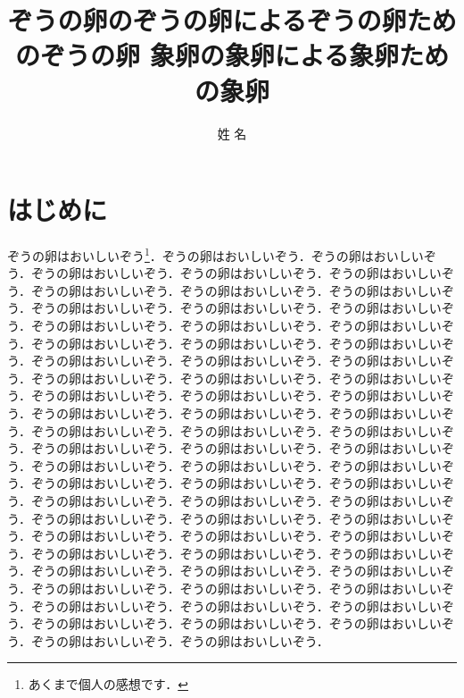 \documentclass[
	10pt,
	a4j,		%
	twocolumn,	%
	uplatex
]{jsarticle}
\title{ぞうの卵のぞうの卵によるぞうの卵ためのぞうの卵 \linebreak 象卵の象卵による象卵ための象卵}
\author{姓 名}
\begin{document}
\maketitle

\section{はじめに}
\label{sec:introduction}
ぞうの卵はおいしいぞう\footnote{あくまで個人の感想です．}．ぞうの卵はおいしいぞう．ぞうの卵はおいしいぞう．ぞうの卵はおいしいぞう．ぞうの卵はおいしいぞう．ぞうの卵はおいしいぞう．ぞうの卵はおいしいぞう．ぞうの卵はおいしいぞう．ぞうの卵はおいしいぞう．ぞうの卵はおいしいぞう．ぞうの卵はおいしいぞう．ぞうの卵はおいしいぞう．ぞうの卵はおいしいぞう．ぞうの卵はおいしいぞう．ぞうの卵はおいしいぞう．ぞうの卵はおいしいぞう．ぞうの卵はおいしいぞう．ぞうの卵はおいしいぞう．ぞうの卵はおいしいぞう．ぞうの卵はおいしいぞう．ぞうの卵はおいしいぞう．ぞうの卵はおいしいぞう．ぞうの卵はおいしいぞう．ぞうの卵はおいしいぞう．ぞうの卵はおいしいぞう．ぞうの卵はおいしいぞう．ぞうの卵はおいしいぞう．ぞうの卵はおいしいぞう．ぞうの卵はおいしいぞう．ぞうの卵はおいしいぞう．ぞうの卵はおいしいぞう．ぞうの卵はおいしいぞう．ぞうの卵はおいしいぞう．ぞうの卵はおいしいぞう．ぞうの卵はおいしいぞう．ぞうの卵はおいしいぞう．ぞうの卵はおいしいぞう．ぞうの卵はおいしいぞう．ぞうの卵はおいしいぞう．ぞうの卵はおいしいぞう．ぞうの卵はおいしいぞう．ぞうの卵はおいしいぞう．ぞうの卵はおいしいぞう．ぞうの卵はおいしいぞう．ぞうの卵はおいしいぞう．ぞうの卵はおいしいぞう．ぞうの卵はおいしいぞう．ぞうの卵はおいしいぞう．ぞうの卵はおいしいぞう．ぞうの卵はおいしいぞう．ぞうの卵はおいしいぞう．ぞうの卵はおいしいぞう．ぞうの卵はおいしいぞう．ぞうの卵はおいしいぞう．ぞうの卵はおいしいぞう．ぞうの卵はおいしいぞう．ぞうの卵はおいしいぞう．ぞうの卵はおいしいぞう．ぞうの卵はおいしいぞう．ぞうの卵はおいしいぞう．ぞうの卵はおいしいぞう．ぞうの卵はおいしいぞう．ぞうの卵はおいしいぞう．ぞうの卵はおいしいぞう．ぞうの卵はおいしいぞう．ぞうの卵はおいしいぞう．ぞうの卵はおいしいぞう．ぞうの卵はおいしいぞう．
\end{document}
